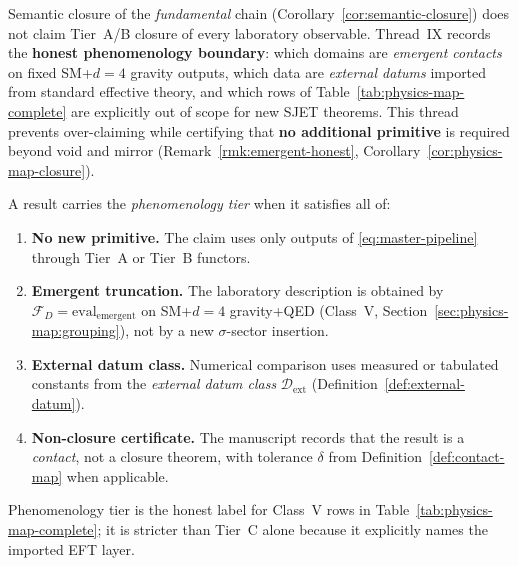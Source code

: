 Semantic closure of the \emph{fundamental} chain
(Corollary~\ref{cor:semantic-closure}) does not claim Tier~A/B closure of every
laboratory observable. Thread~IX records the \textbf{honest phenomenology
boundary}: which domains are \emph{emergent contacts} on fixed SM+$d{=}4$
gravity outputs, which data are \emph{external datums} imported from standard
effective theory, and which rows of Table~\ref{tab:physics-map-complete} are
explicitly out of scope for new SJET theorems. This thread prevents
over-claiming while certifying that \textbf{no additional primitive} is required
beyond void and mirror (Remark~\ref{rmk:emergent-honest},
Corollary~\ref{cor:physics-map-closure}).

\begin{definition}\label{def:phenomenology-tier}
A result carries the \emph{phenomenology tier} when it satisfies all of:
\begin{enumerate}[label=(\roman*),leftmargin=*]
  \item \textbf{No new primitive.} The claim uses only outputs of
    \eqref{eq:master-pipeline} through Tier~A or Tier~B functors.
  \item \textbf{Emergent truncation.} The laboratory description is obtained by
    $\mathcal{F}_D=\mathrm{eval}_{\mathrm{emergent}}$ on SM+$d{=}4$ gravity+QED
    (Class~V, Section~\ref{sec:physics-map:grouping}), not by a new
    $\sigma$-sector insertion.
  \item \textbf{External datum class.} Numerical comparison uses measured or
    tabulated constants from the \emph{external datum class}
    $\mathcal{D}_{\mathrm{ext}}$ (Definition~\ref{def:external-datum}).
  \item \textbf{Non-closure certificate.} The manuscript records that the
    result is a \emph{contact}, not a closure theorem, with tolerance
    $\delta$ from Definition~\ref{def:contact-map} when applicable.
\end{enumerate}
Phenomenology tier is the honest label for Class~V rows in
Table~\ref{tab:physics-map-complete}; it is stricter than Tier~C alone because
it explicitly names the imported EFT layer.
\end{definition}

